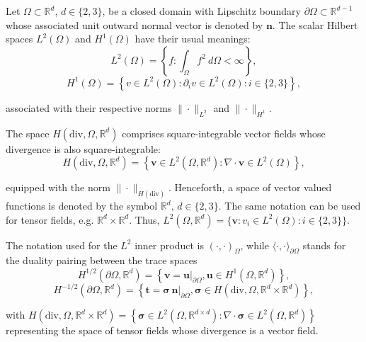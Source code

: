 \documentclass[english,11pt,3p,number,sort&compress]{elsarticle}
\newcommand{\giovane}{\color{red}{\bf\Large GA} \color{cyan} }
\begin{document}
Let $\Omega \subset \mathbb{R}^d$, $d \in \{2, 3\}$, be a closed domain with Lipschitz boundary $\partial \Omega \subset \mathbb{R}^{d-1}$ whose  associated unit outward normal vector is denoted by $\bm{n}$. The scalar Hilbert spaces $L^2(\Omega)$ and $H^1(\Omega)$ have their usual meanings:
\begin{equation*}
    L^2(\Omega) = \left\{f: \int_{\Omega} f^2  ~d \Omega < \infty \right\},
\end{equation*}
\begin{equation*}
    H^1(\Omega) = \left\{v \in L^2(\Omega) : \partial_i v \in L^2 
    (\Omega) : i \in\{2,3\} \right\},
\end{equation*}

\noindent associated with their respective norms $\| \cdot \|_{L^2}$ and $\| \cdot \|_{H^1}$.

The space $H(\text{div},\Omega,\mathbb{R}^d)$ comprises square-integrable vector fields whose divergence is also square-integrable:
\begin{equation*}
	H(\text{div},\Omega,\mathbb{R}^d) = \left\{\bm{v} \in L^2(\Omega,\mathbb{R}^d) : \nabla \cdot \bm{v} \in L^2(\Omega) \right\},
\end{equation*}

\noindent equipped with the norm $\| \cdot \|_{H(\text{div})}$. {\giovane Henceforth, a space of vector valued functions is denoted by the symbol $\mathbb{R}^d, \,d \in \{2,3\}$. The same notation can be used for tensor fields, e.g. $\mathbb{R}^d \times \mathbb{R}^d$. Thus, \(L^2(\Omega,\mathbb{R}^d)=\{\bm{v} : v_i \in L^2(\Omega) : i \in\{2,3\} \}\).}

The notation used for the $L^2$ inner product is $(\cdot,\cdot)_{\Omega}$, while $\langle \cdot,\cdot\rangle_{\partial\Omega}$ stands for the duality pairing between the trace spaces
\begin{equation*}
	H^{1/2}(\partial\Omega,\mathbb{R}^d) = \left\{\bm{v}=\bm{u} \lvert_{\partial\Omega}, \bm{u} \in H^1(\Omega,\mathbb{R}^d)\right\},
\end{equation*}
\begin{equation*}
	H^{-1/2}(\partial\Omega,\mathbb{R}^d) = \left\{\bm{t}=\bm{\sigma} \,\bm{n} \lvert_{\partial\Omega}, \bm{\sigma} \in H(\text{div},\Omega,\mathbb{R}^d \times \mathbb{R}^d) \right\},
\end{equation*}

\noindent with $H(\text{div},\Omega,\mathbb{R}^d \times \mathbb{R}^d) = \left\{\bm{\sigma} \in L^2(\Omega,\mathbb{R}^{d \times d}) : \nabla \cdot \bm{\sigma} \in L^2(\Omega,\mathbb{R}^d) \right\}$ representing the space of tensor fields whose divergence is a vector field.
\end{document}
